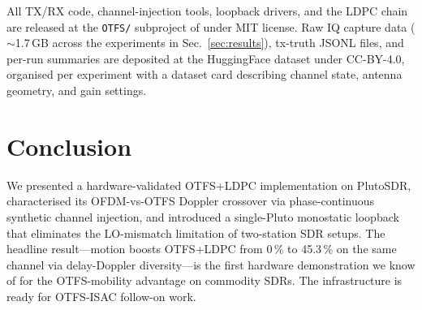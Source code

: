 \documentclass[conference,10pt]{IEEEtran}
\begin{document}
All TX/RX code, channel-injection tools, loopback drivers, and the LDPC chain are released at the \texttt{OTFS/} subproject of \cite{repo_rf_stream_phy} under MIT license. Raw IQ capture data ($\sim$1.7\,GB across the experiments in Sec.~\ref{sec:results}), tx-truth JSONL files, and per-run summaries are deposited at the HuggingFace dataset \cite{hf_dataset} under CC-BY-4.0, organised per experiment with a dataset card describing channel state, antenna geometry, and gain settings.

\section{Conclusion}
We presented a hardware-validated OTFS+LDPC implementation on PlutoSDR, characterised its OFDM-vs-OTFS Doppler crossover via phase-continuous synthetic channel injection, and introduced a single-Pluto monostatic loopback that eliminates the LO-mismatch limitation of two-station SDR setups. The headline result---motion boosts OTFS$+$LDPC from 0\,\% to 45.3\,\% on the same channel via delay-Doppler diversity---is the first hardware demonstration we know of for the OTFS-mobility advantage on commodity SDRs. The infrastructure is ready for OTFS-ISAC follow-on work.
\end{document}
